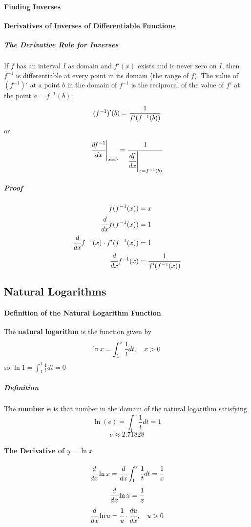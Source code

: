 \documentclass{article}
\begin{document}
            \paragraph{Finding Inverses}
            \paragraph{Derivatives of Inverses of Differentiable Functions}
                \subparagraph{The Derivative Rule for Inverses} If $f$ has an interval $I$ as domain and $f'(x)$ exists and is never zero on $I$, then $f^{-1}$ is differentiable at every point in its domain (the range of $f$). The value of $(f^{-1})'$ at a point $b$ in the domain of $f^{-1}$ is the reciprocal of the value of $f'$ at the point $a=f^{-1}(b)$:
                \[(f^{-1})'(b)=\cfrac{1}{f'(f^{-1}(b))}\]
                or
                \[\cfrac{df^{-1}}{dx}\Bigg|_{x=b}=\cfrac{1}{\cfrac{df}{dx}\Bigg|_{x=f^{-1}(b)}}\]
                \subparagraph{Proof}
                \begin{equation}
                    \begin{aligned}
                        f(f^{-1}(x))&=x\\
                        \cfrac{d}{dx}f(f^{-1}(x))&=1\\
                        \cfrac{d}{dx}f^{-1}(x)\cdot f'(f^{-1}(x))&=1\\
                        \cfrac{d}{dx}f^{-1}(x)&=\cfrac{1}{f'(f^{-1}(x))}
                    \end{aligned}
                \end{equation}
        \subsection{Natural Logarithms}
            \paragraph{Definition of the Natural Logarithm Function}
                The \textbf{natural logarithm} is the function given by
                \[\ln x=\int_1^x \cfrac{1}{t}dt,\quad x>0\]
                so $\ln 1=\int_1^1 \frac{1}{t}dt=0$
                \subparagraph{Definition} The \textbf{number $\bf{e}$} is that number in the domain of the natural logarithm satisfying
                    \[\ln (e)=\int_1^e\frac{1}{t}dt=1\]
                    \[e\approx 2.71828\]
            \paragraph{The Derivative of $y=\ln x$}
                \[\cfrac{d}{dx}\ln x=\cfrac{d}{dx}\int_1^x\cfrac{1}{t}dt=\cfrac{1}{x}\]
                \[\cfrac{d}{dx}\ln x=\cfrac{1}{x}\]
                \begin{equation}
                    \cfrac{d}{dx} \ln u=\cfrac{1}{u}\cdot \cfrac{du}{dx},\quad u>0
                \end{equation}
\end{document}
